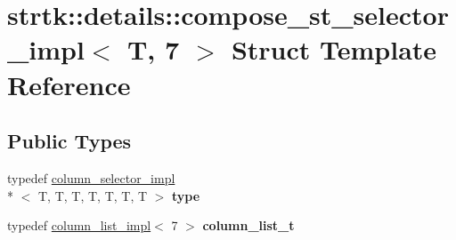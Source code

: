 \hypertarget{structstrtk_1_1details_1_1compose__st__selector__impl_3_01T_00_017_01_4}{\section{strtk\-:\-:details\-:\-:compose\-\_\-st\-\_\-selector\-\_\-impl$<$ T, 7 $>$ Struct Template Reference}
\label{structstrtk_1_1details_1_1compose__st__selector__impl_3_01T_00_017_01_4}
}
\subsection*{Public Types}
\begin{DoxyCompactItemize}
\item 
\hypertarget{structstrtk_1_1details_1_1compose__st__selector__impl_3_01T_00_017_01_4_a1bfa64268a6f4080670318ed9dac3299}{typedef \hyperlink{classstrtk_1_1details_1_1column__selector__impl}{column\-\_\-selector\-\_\-impl}\\*
$<$ T, T, T, T, T, T, T $>$ {\bfseries type}}\label{structstrtk_1_1details_1_1compose__st__selector__impl_3_01T_00_017_01_4_a1bfa64268a6f4080670318ed9dac3299}

\item 
\hypertarget{structstrtk_1_1details_1_1compose__st__selector__impl_3_01T_00_017_01_4_aa5832ebb22c497eab321448ee64c11f1}{typedef \hyperlink{structstrtk_1_1details_1_1column__list__impl}{column\-\_\-list\-\_\-impl}$<$ 7 $>$ {\bfseries column\-\_\-list\-\_\-t}}\label{structstrtk_1_1details_1_1compose__st__selector__impl_3_01T_00_017_01_4_aa5832ebb22c497eab321448ee64c11f1}

\end{DoxyCompactItemize}
